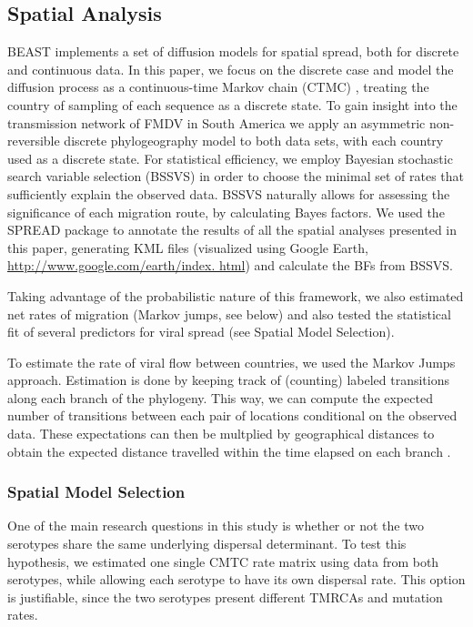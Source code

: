 \documentclass[10pt]{article}
\begin{document}
\subsection*{Spatial Analysis}

BEAST \cite{BEAST} implements a set of diffusion models for spatial spread, both for discrete and continuous data. In this paper, we focus on the discrete case and model the diffusion process as a continuous-time Markov chain (CTMC) \cite{roots}, treating the country of sampling of each sequence as a discrete state. To gain insight into the transmission network of FMDV in South America we apply an asymmetric non-reversible discrete phylogeography model to both data sets, with each country used as a discrete state. For statistical efficiency, we employ Bayesian stochastic search variable selection (BSSVS) in order to choose the minimal set of rates that sufficiently explain the observed data. BSSVS naturally allows for assessing the significance of each migration route, by calculating Bayes factors. We used the SPREAD \cite{spread} package to annotate the results of all the spatial analyses presented in this paper, generating KML files (visualized using Google Earth, \url{http://www.google.com/earth/index.
html}) and calculate the BFs from BSSVS.

Taking advantage of the probabilistic nature of this framework, we also estimated net rates of migration (Markov jumps, see below) and also tested the statistical fit of several predictors for viral spread (see Spatial Model Selection).

To estimate the rate of viral flow between countries, we used the Markov Jumps \cite{Minin2008} approach. Estimation is done by keeping track of (counting) labeled transitions along each branch of the phylogeny. This way, we can compute the expected number of transitions between each pair of locations conditional on the observed data. These expectations can then be multplied by geographical distances to obtain the expected distance travelled within the time elapsed on each branch \cite{zoonotic}.


\subsubsection*{Spatial Model Selection}

One of the main research questions in this study is whether or not the two serotypes share the same underlying dispersal determinant. 
To test this hypothesis, we estimated one single CMTC rate matrix using data from both serotypes, while allowing each serotype to have its own dispersal rate. 
This option is justifiable, since the two serotypes present different TMRCAs and mutation rates. 
\end{document}
